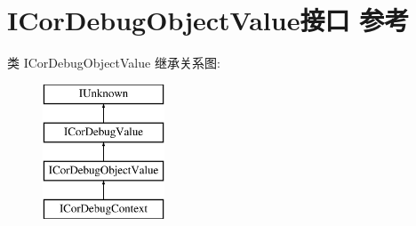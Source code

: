 \hypertarget{interface_i_cor_debug_object_value}{}\section{I\+Cor\+Debug\+Object\+Value接口 参考}
\label{interface_i_cor_debug_object_value}
类 I\+Cor\+Debug\+Object\+Value 继承关系图\+:\begin{figure}[H]
\begin{center}
\leavevmode
\includegraphics[height=4.000000cm]{interface_i_cor_debug_object_value}
\end{center}
\end{figure}
